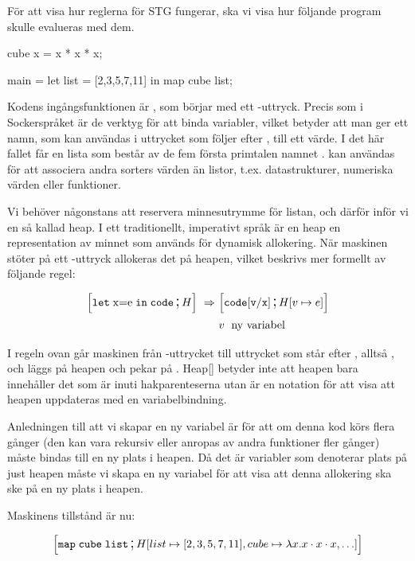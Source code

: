 \documentclass[../Core]{subfiles}
\begin{document}
För att visa hur reglerna
för STG  fungerar, ska vi visa hur följande program skulle evalueras med dem.

\begin{codeEx}
cube x = x * x * x;

main = let list = [2,3,5,7,11]
        in map cube list;
\end{codeEx}

Kodens ingångsfunktionen är , som börjar med ett -uttryck.
Precis som i Sockerspråket är de verktyg för att binda variabler, vilket betyder att man ger ett
namn, som kan användas i uttrycket som följer efter ,
till ett värde. I det här fallet får
en lista som består av de fem första primtalen namnet .
 kan användas för att associera andra sorters värden än listor,
t.ex. datastrukturer, numeriska värden eller funktioner.

Vi behöver någonstans att reservera minnesutrymme för listan, och därför
inför vi en så kallad heap. I ett traditionellt, imperativt språk är
en heap en representation av minnet som används för dynamisk allokering. När
maskinen stöter på ett -uttryck allokeras det på heapen, vilket
beskrivs mer formellt av följande regel:

\begin{align*}
\text{\large$$}\Big[\mathtt{let\;\mathrm{x\mathtt{=}e}\; in\; code} \,\text{\Large;}\, H\Big]\,\,\Rightarrow\,\, & \text{\large$$}\Big[\mathtt{code[v/x]} \,\text{\Large;}\, H[v\mapsto e]\Big] \\
 & v\; \text{ ny variabel} \nonumber
\end{align*}

I regeln ovan går maskinen från -uttrycket till
uttrycket som står efter , alltså ,
och  läggs på heapen och pekar på .
Heap{[}{]} betyder inte att heapen bara innehåller det som är inuti
hakparenteserna utan är en notation för att visa att heapen
uppdateras med en variabelbindning.

Anledningen till att vi skapar en ny variabel  är för att om
denna kod körs flera gånger (den kan vara rekursiv eller anropas av andra funktioner
fler gånger) måste  bindas till en ny plats i heapen. Då det är variabler som
denoterar plats på just heapen måste vi skapa en ny variabel för att visa att denna
allokering ska ske på en ny plats i heapen.

Maskinens tillstånd är nu:

\begin{align*}
\text{\large$$}\Big[\mathtt{map\; cube\; list} \,\text{\Large;}\, H[list\mapsto[2,3,5,7,11],cube\mapsto\lambda x.x\cdot x\cdot x,\ldots]\Big]
\end{align*}
\end{document}
